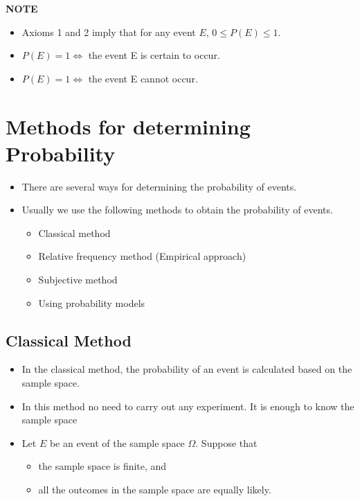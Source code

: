 \documentclass[]{book}
\providecommand{\tightlist}{%
  \setlength{\itemsep}{0pt}\setlength{\parskip}{0pt}}
\begin{document}
\textbf{NOTE}

\begin{itemize}
\tightlist
\item
  Axioms 1 and 2 imply that for any event \(E\), \(0 \leq P (E) \leq 1\).
\item
  \(P (E) = 1 \iff\) the event E is certain to occur.
\item
  \(P (E) = 1 \iff\) the event E cannot occur.
\end{itemize}

\hypertarget{methods-for-determining-probability}{%
\section{Methods for determining Probability}\label{methods-for-determining-probability}}

\begin{itemize}
\tightlist
\item
  There are several ways for determining the probability of events.
\item
  Usually we use the following methods to obtain the probability of events.

  \begin{itemize}
  \tightlist
  \item
    Classical method
  \item
    Relative frequency method (Empirical approach)
  \item
    Subjective method
  \item
    Using probability models
  \end{itemize}
\end{itemize}

\hypertarget{classical-method}{%
\subsection{Classical Method}\label{classical-method}}

\begin{itemize}
\tightlist
\item
  In the classical method, the probability of an event is calculated based on the sample space.
\item
  In this method no need to carry out any experiment. It is enough to know the sample space
\item
  Let \(E\) be an event of the sample space \(\Omega\). Suppose that

  \begin{itemize}
  \tightlist
  \item
    the sample space is finite, and
  \item
    all the outcomes in the sample space are equally likely.
  \end{itemize}
\end{itemize}
\end{document}
